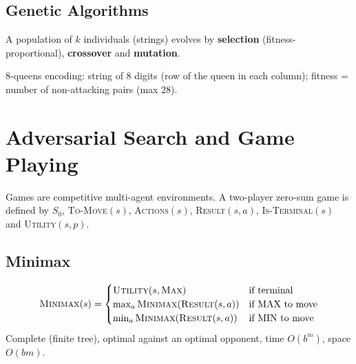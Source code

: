 \subsection{Genetic Algorithms}
A population of $k$ individuals (strings) evolves by \textbf{selection} (fitness-proportional), \textbf{crossover} and \textbf{mutation}.
\begin{center}
\end{center}
8-queens encoding: string of 8 digits (row of the queen in each column); fitness = number of non-attacking pairs (max 28).

\section{Adversarial Search and Game Playing}
Games are competitive multi-agent environments. A two-player zero-sum game is defined by $S_0$, \textsc{To-Move}$(s)$, \textsc{Actions}$(s)$, \textsc{Result}$(s,a)$, \textsc{Is-Terminal}$(s)$ and \textsc{Utility}$(s,p)$.

\subsection{Minimax}
\[\textsc{Minimax}(s)=\begin{cases}\textsc{Utility}(s,\textsc{Max}) & \text{if terminal}\\ \max_{a}\textsc{Minimax}(\textsc{Result}(s,a)) & \text{if MAX to move}\\ \min_{a}\textsc{Minimax}(\textsc{Result}(s,a)) & \text{if MIN to move}\end{cases}\]
Complete (finite tree), optimal against an optimal opponent, time $O(b^{m})$, space $O(bm)$.

